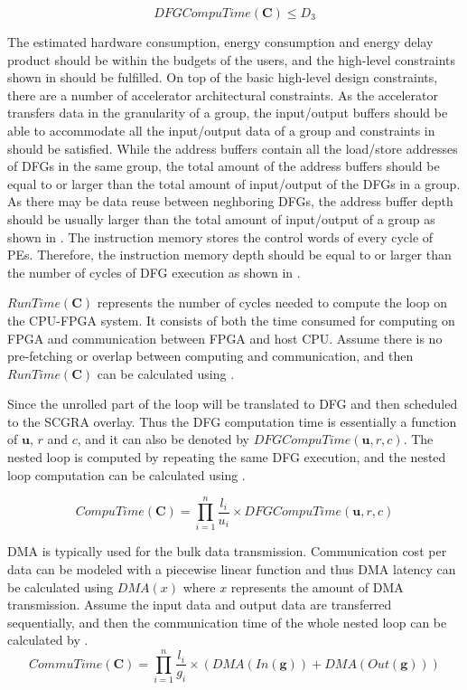 \begin{equation} \label{eq:constraints4}
DFGCompuTime(\bm{C}) \leq D_3
\end{equation}

The estimated hardware consumption, energy consumption and energy delay product should be within the budgets of the users, and the high-level constraints shown in  should be fulfilled. On top of the basic high-level design constraints, there are a number of accelerator architectural constraints. As the accelerator transfers data in the granularity of a group, the input/output buffers should be able to accommodate all the input/output data of a group and constraints in  should be satisfied. While the address buffers contain all the load/store addresses of DFGs in the same group, the total amount of the address buffers should be equal to or larger than the total amount of input/output of the DFGs in a group. As there may be data reuse between neghboring DFGs, the address buffer depth should be usually larger than the total amount of input/output of a group as shown in . The instruction memory stores the control words of every cycle of PEs. Therefore, the instruction memory depth should be equal to or larger than the number of cycles of DFG execution as shown in .

$RunTime(\bm{C})$ represents the number of cycles needed to compute the loop on the CPU-FPGA system. It consists of both the time consumed for computing on FPGA and communication between FPGA and host CPU. Assume there is no pre-fetching or overlap between computing and communication, and then $RunTime(\bm{C})$ can be calculated using .

Since the unrolled part of the loop will be translated to DFG and then scheduled to the SCGRA overlay. Thus the DFG computation time is essentially a function of $\mathbf{u}$, $r$ and $c$, and it can also be denoted by $DFGCompuTime(\mathbf{u},r,c)$. The nested loop is computed by repeating the same DFG execution, and the nested loop computation can be calculated using .

\begin{equation} \label{eq:loopexetime}
    CompuTime(\bm{C})=\displaystyle \prod_{i=1}^{n} \frac{l_i}{u_i} \times DFGCompuTime(\mathbf{u},r,c)
\end{equation}

DMA is typically used for the bulk data transmission. Communication cost per data can be modeled with a piecewise linear function and thus DMA latency can be calculated using $DMA(x)$ where $x$ represents the amount of DMA transmission. Assume the input data and output data are transferred sequentially, and then the communication time of the whole nested loop can be calculated by .
\begin{equation} \label{eq:commu}
    CommuTime(\bm{C})=\displaystyle \prod_{i=1}^{n} \frac{l_i}{g_i} \times 
    (DMA(In(\mathbf{g}))+DMA(Out(\mathbf{g})))
\end{equation}

